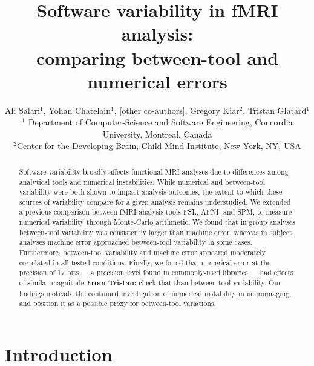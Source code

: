 \documentclass[11pt,onecolumn]{article}
\begin{document}
\newcommand{\fslspm}{FSL-SPM\xspace}
\newcommand{\fslafni}{FSL-AFNI\xspace}
\newcommand{\afnispm}{AFNI-SPM\xspace}
\newcommand{\tristan}[1]{\color{orange}\textbf{From Tristan:} #1\color{black}\xspace}
\newcommand{\ali}[2]{\color{green}\textbf{Ali:} #1\color{black}\xspace}
\newcommand{\discuss}[1]{\uwave{#1}}


\title{Software variability in fMRI analysis:\\ comparing between-tool and numerical errors}

\author{Ali Salari$^1$, Yohan Chatelain$^1$, [other co-authors], Gregory Kiar$^2$, Tristan Glatard$^1$ \\
$^1$ Department of Computer-Science and Software Engineering, Concordia University, Montreal, Canada\\
$^2$Center for the Developing Brain, Child Mind Institute, New York, NY, USA}

\maketitle
\begin{abstract}

Software variability broadly affects functional MRI analyses due to
differences among analytical tools and numerical instabilities. While
numerical and between-tool variability were both shown to impact analysis
outcomes, the extent to which these sources of variability compare for a
given analysis remains understudied. We extended a previous comparison
between fMRI analysis tools FSL, AFNI, and SPM, to measure numerical
variability through Monte-Carlo arithmetic. We found that in group analyses
between-tool variability was consistently larger than machine error,
whereas in subject analyses machine error approached between-tool
variability in some cases. Furthermore, between-tool variability and
machine error appeared moderately correlated in all tested conditions.
Finally, we found that numerical error at the precision of 17 bits --- a
precision level found in commonly-used libraries --- had effects of similar
magnitude \tristan{check that} than between-tool variability. Our findings motivate the
continued investigation of numerical instability in neuroimaging, and position it 
as a possible proxy for between-tool variations.
\end{abstract}

\section{Introduction}
\end{document}
